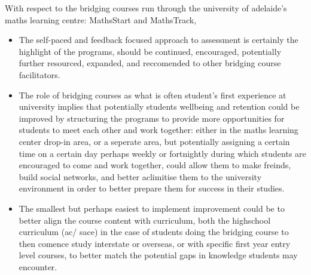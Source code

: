 \documentclass[twoside,12pt,a4paper]{report}
\begin{document}
With respect to the bridging courses run through the university of adelaide's maths learning centre: MathsStart and MathsTrack,
\begin{itemize}
	\item The self-paced and feedback focused approach to assessment is certainly the highlight of the programs, should be continued, encouraged, potentially further resourced, expanded, and reccomended to other bridging course facilitators.
	\item The role of bridging courses as what is often student's first experience at university implies that potentially students wellbeing and retention could be improved by structuring the programs to provide more opportunities for students to meet each other and work together: either in the maths learning center drop-in area, or a seperate area, but potentially assigning a certain time on a certain day perhaps weekly or fortnightly during which students are encouraged to come and work together, could allow them to make freinds, build social networks, and better aclimitise them to the university environment in order to better prepare them for success in their studies.
	\item The smallest but perhaps easiest to implement improvement could be to better align the course content with curriculum, both the highschool curriculum (\gls{ac}/ \gls{sace}) in the case of students doing the bridging course to then comence study interstate or overseas, or with specific first year entry level courses, to better match the potential gaps in knowledge students may encounter.
\end{itemize}

\glsresetall

 
\end{document}
